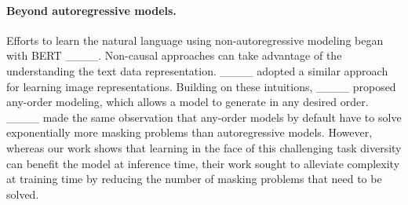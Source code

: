 \paragraph{Beyond autoregressive models.}
Efforts to learn the natural language using non-autoregressive modeling began with BERT ____. Non-causal approaches can take advantage of the understanding the text data representation. ____ adopted a similar approach for learning image representations. Building on these intuitions, 
____ proposed any-order modeling, which allows a model to generate in any desired order. ____ made the same observation that any-order models by default have to solve exponentially more masking problems than autoregressive models. However, whereas our work shows that learning in the face of this challenging task diversity can benefit the model at inference time, their work sought to alleviate complexity at training time by reducing the number of masking problems that need to be solved.